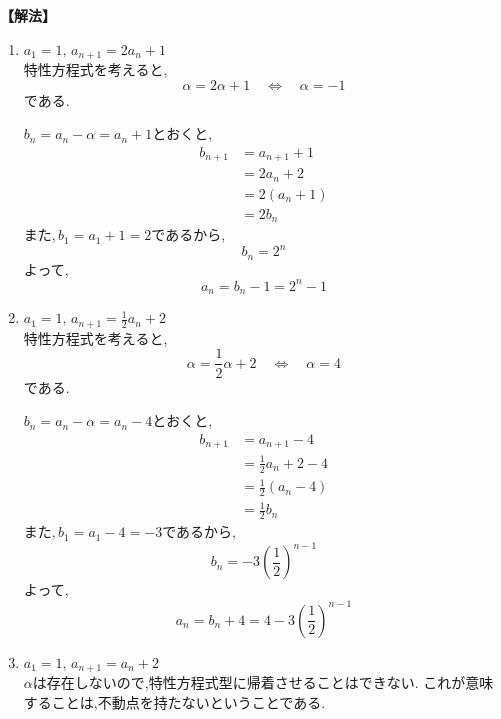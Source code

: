 \noindent\textbf{【解法】}
\begin{enumerate}[label=(\arabic*),parsep=3pt]
  \item $\displaystyle a_1=1,\,a_{n+1}=2a_n+1$\\
        特性方程式を考えると,
        \[
          \alpha=2\alpha+1
          \quad\Longleftrightarrow\quad
          \alpha=-1
        \]
        である.

        $b_n=a_n-\alpha=a_n+1$とおくと,
        \begin{align*}
          b_{n+1}
            &=a_{n+1}+1\\
            &=2a_n+2\\
            &=2(a_n+1)\\
            &=2b_n
        \end{align*}
        また,\,$b_1=a_1+1=2$であるから,
        \[
          b_n=2^n
        \]
        よって,
        \[
          a_n=b_n-1=2^n-1
        \]

  \item $\displaystyle a_1=1,\,a_{n+1}=\frac12a_n+2$\\
          特性方程式を考えると,
          \[
            \alpha=\frac12\alpha+2
            \quad\Longleftrightarrow\quad
            \alpha=4
          \]
          である.

          $b_n=a_n-\alpha=a_n-4$とおくと,
          \begin{align*}
            b_{n+1}
              &=a_{n+1}-4\\
              &=\frac12a_n+2-4\\
              &=\frac12(a_n-4)\\
              &=\frac12b_n
          \end{align*}
          また,\,$b_1=a_1-4=-3$であるから,
          \[
            b_n=-3\left(\frac12\right)^{n-1}
          \]
          よって,
          \[
            a_n=b_n+4
            =4-3\left(\frac12\right)^{n-1}
          \]
   \item $\displaystyle a_1=1,\, a_{n+1}=a_n+2$\\
         $\alpha$は存在しないので,特性方程式型に帰着させることはできない.
         これが意味することは,不動点を持たないということである.
\end{enumerate}

